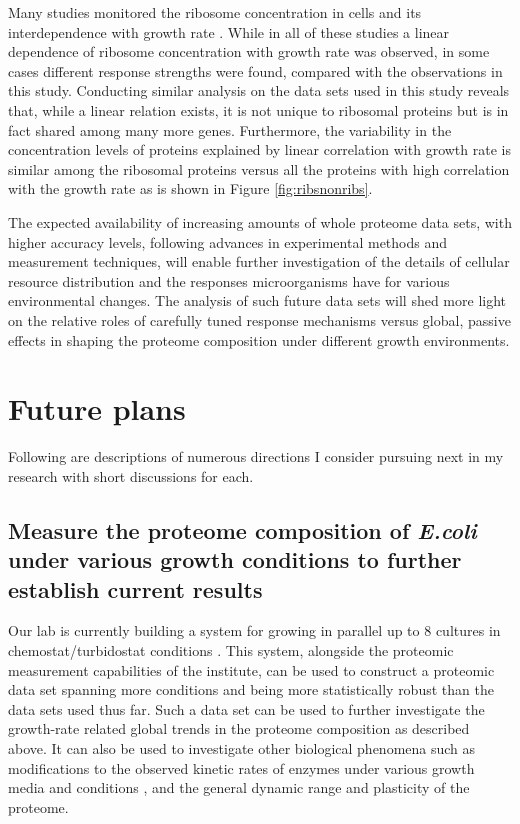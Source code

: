 \documentclass[notitlepage]{article}
\begin{document}
Many studies monitored the ribosome concentration in cells and its interdependence with growth rate \cite{Scott2010, Bremer1987, Schaechter1958, ingraham1983growth, Zaslaver2009}.
While in all of these studies a linear dependence of ribosome concentration with growth rate was observed, in some cases different response strengths were found, compared with the observations in this study.
Conducting similar analysis on the data sets used in this study reveals that, while a linear relation exists, it is not unique to ribosomal proteins but is in fact shared among many more genes.
Furthermore, the variability in the concentration levels of proteins explained by linear correlation with growth rate is similar among the ribosomal proteins versus all the proteins with high correlation with the growth rate as is shown in Figure \ref{fig:ribsnonribs}.

The expected availability of increasing amounts of whole proteome data sets, with higher accuracy levels, following advances in experimental methods and measurement techniques, will enable further investigation of the details of cellular resource distribution and the responses microorganisms have for various environmental changes.
The analysis of such future data sets will shed more light on the relative roles of carefully tuned response mechanisms versus global, passive effects in shaping the proteome composition under different growth environments.


\section{Future plans}
Following are descriptions of numerous directions I consider pursuing next in my research with short discussions for each.
\subsection{Measure the proteome composition of \emph{E.coli} under various growth conditions to further establish current results}
Our lab is currently building a system for growing in parallel up to 8 cultures in chemostat/turbidostat conditions \cite{Takahashi2014}.
This system, alongside the proteomic measurement capabilities of the institute, can be used to construct a proteomic data set spanning more conditions and being more statistically robust than the data sets used thus far.
Such a data set can be used to further investigate the growth-rate related global trends in the proteome composition as described above.
It can also be used to investigate other biological phenomena such as modifications to the observed kinetic rates of enzymes under various growth media and conditions \cite{Valgepea2013}, and the general dynamic range and plasticity of the proteome.
\end{document}
